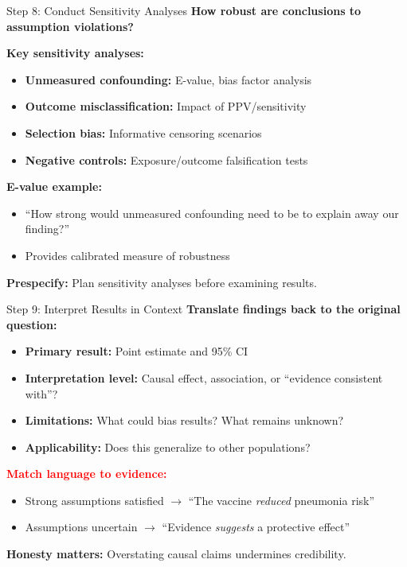 \documentclass[aspectratio=169]{beamer}
\begin{document}
\begin{frame}{Step 8: Conduct Sensitivity Analyses}
  \small
  \textbf{How robust are conclusions to assumption violations?}
  \vspace{0.1em}

  \textbf{Key sensitivity analyses:}
  \begin{itemize}
    \item \textbf{Unmeasured confounding:} E-value, bias factor analysis
    \item \textbf{Outcome misclassification:} Impact of PPV/sensitivity
    \item \textbf{Selection bias:} Informative censoring scenarios
    \item \textbf{Negative controls:} Exposure/outcome falsification tests
  \end{itemize}
  \vspace{0.1em}

  \textbf{E-value example:}
  \begin{itemize}
    \item ``How strong would unmeasured confounding need to be to explain away our finding?''
    \item Provides calibrated measure of robustness
  \end{itemize}
  \vspace{0.1em}

  \textcolor{accent}{\textbf{Prespecify:}} Plan sensitivity analyses before examining results.
\end{frame}

\begin{frame}{Step 9: Interpret Results in Context}
  \small
  \textbf{Translate findings back to the original question:}
  \vspace{0.5em}

  \begin{itemize}
    \item \textbf{Primary result:} Point estimate and 95\% CI
    \item \textbf{Interpretation level:} Causal effect, association, or ``evidence consistent with''?
    \item \textbf{Limitations:} What could bias results? What remains unknown?
    \item \textbf{Applicability:} Does this generalize to other populations?
  \end{itemize}
  \vspace{0.5em}

  \textcolor{red}{\textbf{Match language to evidence:}}
  \begin{itemize}
    \item Strong assumptions satisfied $\rightarrow$ ``The vaccine \emph{reduced} pneumonia risk''
    \item Assumptions uncertain $\rightarrow$ ``Evidence \emph{suggests} a protective effect''
  \end{itemize}
  \vspace{0.5em}

  \textcolor{accent}{\textbf{Honesty matters:}} Overstating causal claims undermines credibility.
\end{frame}
\end{document}
